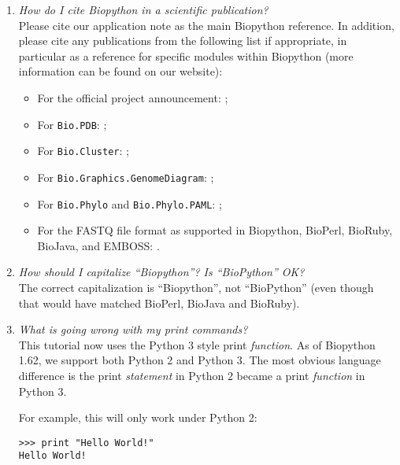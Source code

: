 \documentclass{report}
\begin{document}
\begin{enumerate}

  \item \emph{How do I cite Biopython in a scientific publication?} \\
  Please cite our application note \cite[Cock \textit{et al.}, 2009]{cock2009}
  as the main Biopython reference.
  In addition, please cite any publications from the following list if appropriate, in particular as a reference for specific modules within Biopython (more information can be found on our website):
  \begin{itemize}
    \item For the official project announcement: \cite[Chapman and Chang, 2000]{chapman2000};
    \item For \verb+Bio.PDB+: \cite[Hamelryck and Manderick, 2003]{hamelryck2003a};
    \item For \verb+Bio.Cluster+: \cite[De Hoon \textit{et al.}, 2004]{dehoon2004};
    \item For \verb+Bio.Graphics.GenomeDiagram+: \cite[Pritchard \textit{et al.}, 2006]{pritchard2006};
    \item For \verb+Bio.Phylo+ and \verb+Bio.Phylo.PAML+: \cite[Talevich \textit{et al.}, 2012]{talevich2012};
    \item For the FASTQ file format as supported in Biopython, BioPerl, BioRuby, BioJava, and EMBOSS: \cite[Cock \textit{et al.}, 2010]{cock2010}.
  \end{itemize}

  \item \emph{How should I capitalize ``Biopython''?  Is ``BioPython'' OK?} \\
  The correct capitalization is ``Biopython'', not ``BioPython'' (even though
  that would have matched BioPerl, BioJava and BioRuby).

  \item \emph{What is going wrong with my print commands?} \\
  This tutorial now uses the Python 3 style print \emph{function}.
  As of Biopython 1.62, we support both Python 2 and Python 3.
  The most obvious language difference is the print \emph{statement}
  in Python 2 became a print \emph{function} in Python 3.

  For example, this will only work under Python 2:

\begin{verbatim}
>>> print "Hello World!"
Hello World!
\end{verbatim}


\end{enumerate}
\end{document}

